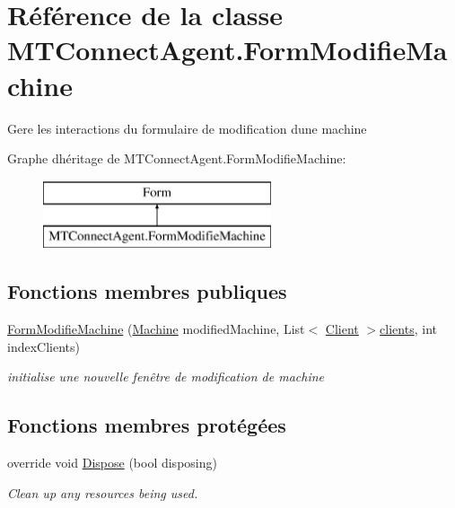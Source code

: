 \hypertarget{class_m_t_connect_agent_1_1_form_modifie_machine}{}\section{Référence de la classe M\+T\+Connect\+Agent.\+Form\+Modifie\+Machine}
\label{class_m_t_connect_agent_1_1_form_modifie_machine}


Gere les interactions du formulaire de modification d\textquotesingle{}une machine  


Graphe d\textquotesingle{}héritage de M\+T\+Connect\+Agent.\+Form\+Modifie\+Machine\+:\begin{figure}[H]
\begin{center}
\leavevmode
\includegraphics[height=2.000000cm]{class_m_t_connect_agent_1_1_form_modifie_machine}
\end{center}
\end{figure}
\subsection*{Fonctions membres publiques}
\begin{DoxyCompactItemize}
\item 
\mbox{\hyperlink{class_m_t_connect_agent_1_1_form_modifie_machine_ae62f91bfe4ad79f9a56396faab542324}{Form\+Modifie\+Machine}} (\mbox{\hyperlink{class_m_t_connect_agent_1_1_model_1_1_machine}{Machine}} modified\+Machine, List$<$ \mbox{\hyperlink{class_m_t_connect_agent_1_1_model_1_1_client}{Client}} $>$\mbox{\hyperlink{class_m_t_connect_agent_1_1_form_modifie_machine_a62e4eec844c191c07dde494ceaeed749}{clients}}, int index\+Clients)
\begin{DoxyCompactList}\small\item\em initialise une nouvelle fenêtre de modification de machine \end{DoxyCompactList}\end{DoxyCompactItemize}
\subsection*{Fonctions membres protégées}
\begin{DoxyCompactItemize}
\item 
override void \mbox{\hyperlink{class_m_t_connect_agent_1_1_form_modifie_machine_a8218fb0e59b46bb90bbc3567f09e910c}{Dispose}} (bool disposing)
\begin{DoxyCompactList}\small\item\em Clean up any resources being used. \end{DoxyCompactList}\end{DoxyCompactItemize}
